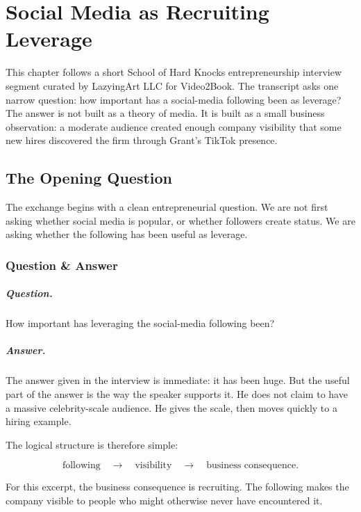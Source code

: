 \chapter{Social Media as Recruiting Leverage}

This chapter follows a short School of Hard Knocks entrepreneurship interview segment curated by LazyingArt LLC for Video2Book. The transcript asks one narrow question: how important has a social-media following been as leverage? The answer is not built as a theory of media. It is built as a small business observation: a moderate audience created enough company visibility that some new hires discovered the firm through Grant's TikTok presence.

\section{The Opening Question}

The exchange begins with a clean entrepreneurial question. We are not first asking whether social media is popular, or whether followers create status. We are asking whether the following has been useful as leverage.

\subsection{Question \& Answer}

\paragraph{Question.}
How important has leveraging the social-media following been?

\paragraph{Answer.}
The answer given in the interview is immediate: it has been huge. But the useful part of the answer is the way the speaker supports it. He does not claim to have a massive celebrity-scale audience. He gives the scale, then moves quickly to a hiring example.

The logical structure is therefore simple:

\begin{equation}
\text{following} \quad \longrightarrow \quad \text{visibility} \quad \longrightarrow \quad \text{business consequence}.
\end{equation}

For this excerpt, the business consequence is recruiting. The following makes the company visible to people who might otherwise never have encountered it.

